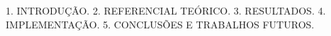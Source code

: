 1. INTRODUÇÃO. 2. REFERENCIAL TEÓRICO. 3. RESULTADOS. 4. IMPLEMENTAÇÃO. 5. CONCLUSÕES E TRABALHOS FUTUROS.